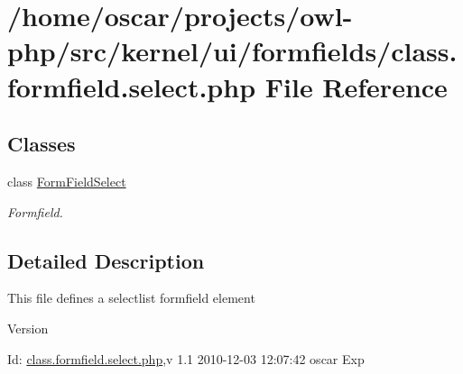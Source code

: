\section{/home/oscar/projects/owl-\/php/src/kernel/ui/formfields/class.formfield.select.php File Reference}
\label{class_8formfield_8select_8php}
\subsection*{Classes}
\begin{DoxyCompactItemize}
\item 
class \hyperlink{classFormFieldSelect}{FormFieldSelect}
\begin{DoxyCompactList}\small\item\em Formfield. \item\end{DoxyCompactList}\end{DoxyCompactItemize}


\subsection{Detailed Description}
This file defines a selectlist formfield element \begin{DoxyVersion}{Version}

\end{DoxyVersion}
\begin{DoxyParagraph}{Id:}
\hyperlink{class_8formfield_8select_8php}{class.formfield.select.php},v 1.1 2010-\/12-\/03 12:07:42 oscar Exp 
\end{DoxyParagraph}

